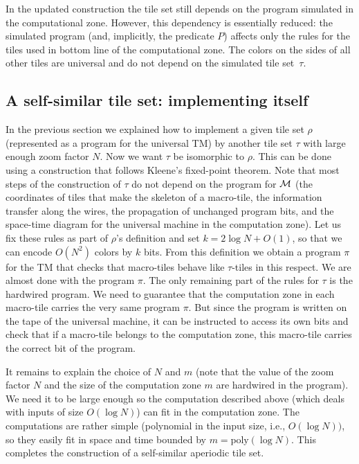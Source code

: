 \documentclass[runningheads]{llncs}
\newcommand{\poly}{\mathrm{poly}}
\begin{document}
In the updated construction the tile set still depends on the program simulated in the computational zone. However, this dependency is essentially reduced: the simulated program (and, implicitly, the predicate $P$) affects only the rules for the tiles used in bottom line of the computational zone. The colors on the sides of all other tiles are universal and do not depend on the simulated tile set~$\tau$.

\subsection{A self-similar tile set:  implementing itself}


In the previous section we explained  how to implement a given tile set $\rho$ (represented as a program for the universal TM) by another tile set $\tau$ with large enough zoom factor $N$. Now we want $\tau$ be isomorphic to $\rho$. This can be done using a construction that follows Kleene's fixed-point theorem.
Note that most steps of the construction of  $\tau$ do not depend on the program for $\cal M$ (the coordinates of tiles that make the skeleton of a macro-tile, the information transfer along the wires, the propagation of unchanged program bits, and the space-time diagram for the universal machine in the computation zone). Let us fix these rules as part of $\rho$'s definition and set $k = 2 \log N + O(1)$, so that we can encode $O(N^2)$ colors by $k$ bits.  From this definition we  obtain a program $\pi$ for the TM  that checks that macro-tiles behave like $\tau$-tiles in this respect. We are almost done with the program $\pi$. The only remaining part of the rules for $\tau$ is the hardwired program. We need to guarantee that the computation zone in each macro-tile carries the very same program $\pi$. But since the program is written on the tape of the universal machine, it can be instructed to access its own bits and check that if a macro-tile belongs to the computation zone, this macro-tile carries the correct bit of the program.

It remains to explain the choice of $N$ and $m$ (note that the value of the zoom factor $N$ and the size of the computation zone $m$ are hardwired in the program). We need it to be large enough so the computation described above   (which deals with inputs of size $O(\log N)$) can fit in the computation zone. The computations are rather simple (polynomial in the input size, i.e., $O(\log N))$, so they easily fit in space and time bounded by $m=\poly(\log N)$.
This completes the construction of a self-similar aperiodic tile set.
 
\end{document}
